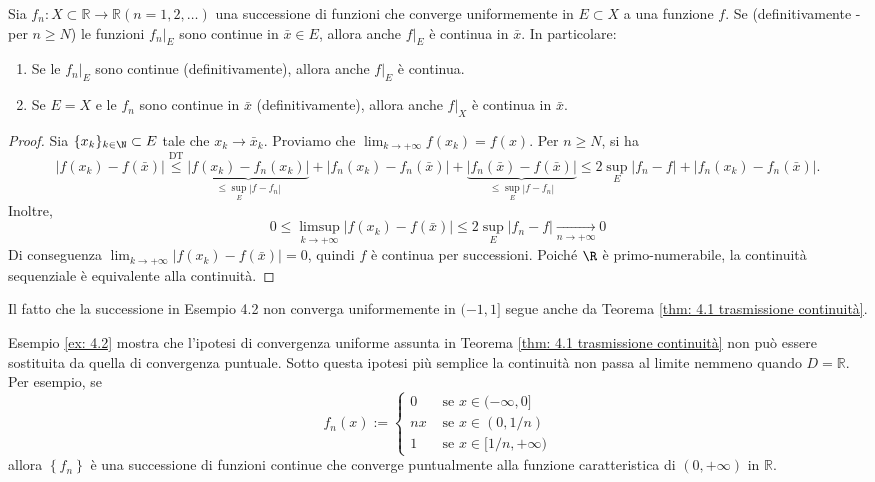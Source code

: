 \begin{shadedTheorem}\label{thm: 4.1 trasmissione continuità}
    Sia $f_{n}: X \subset \mathbb{R} \rightarrow \mathbb{R}(n=1,2, \ldots)$ una successione di funzioni che converge uniformemente in $E \subset X$ a una funzione $f$. Se (definitivamente - per $n\geq N$) le funzioni $\left.f_{n}\right|_{E}$ sono continue in $\bar{x} \in E$, allora anche $\left.f\right|_{E}$ è continua in $\bar{x}$. In particolare:
    \begin{enumerate}
        \item Se le $\left.f_{n}\right|_{E}$ sono continue (definitivamente), allora anche $\left.f\right|_{E}$ è continua.
        \item Se $E=X$ e le $f_{n}$ sono continue in $\bar{x}$ (definitivamente), allora anche $\left.f\right|_{X}$ è continua in $\bar{x}$.
    \end{enumerate}
\end{shadedTheorem}
\begin{proof}
    Sia $\{x_k\}_{k\in \N}\subset E$ tale che $x_k\to \bar x_k$. Proviamo che $\lim_{k\to +\infty}f(x_k)=f(x)$. Per $n\geq N$, si ha
    \[|f(x_k)-f(\bar x)|\overset{\text{DT}}{\leq} \underbrace{|f(x_k)-f_n(x_k)|}_{\leq \sup_E|f-f_n|}+|f_n(x_k)-f_n(\bar x)| + \underbrace{|f_n(\bar x)-f(\bar x)|}_{\leq \sup_E|f-f_n|} \leq 2 \sup_E|f_n-f| + |f_n(x_k)-f_n(\bar x)|.\]
    Inoltre, 
    \[0\leq \limsup_{k\to +\infty}|f(x_k)-f(\bar x)|\leq 2\sup_E|f_n-f|\xrightarrow[n\to +\infty]{}0\]
    Di conseguenza $\lim_{k\to +\infty}|f(x_k)-f(\bar x)|=0$, quindi $f$ è continua per successioni. Poiché $\R$ è primo-numerabile, la continuità sequenziale è equivalente alla continuità.
\end{proof}
\begin{oss}
    Il fatto che la successione in Esempio 4.2 non converga uniformemente in $(-1,1]$ segue anche da Teorema \ref{thm: 4.1 trasmissione continuità}.
\end{oss}

\begin{oss}
    Esempio \ref{ex: 4.2} mostra che l'ipotesi di convergenza uniforme assunta in Teorema \ref{thm: 4.1 trasmissione continuità} non può essere sostituita da quella di convergenza puntuale. Sotto questa ipotesi più semplice la continuità non passa al limite nemmeno quando $D=\mathbb{R}$. Per esempio, se
    \[f_{n}(x):= \begin{cases}0 & \text { se } x \in(-\infty, 0] \\ n x & \text { se } x \in(0,1 / n) \\ 1 & \text { se } x \in[1 / n,+\infty)\end{cases}\]
    allora $\left\{f_{n}\right\}$ è una successione di funzioni continue che converge puntualmente alla funzione caratteristica di $(0,+\infty)$ in $\mathbb{R}$.
\end{oss}

